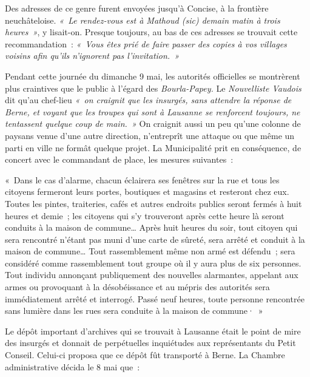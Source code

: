 \documentclass[french,twoside]{book} %
\newenvironment{quoteblock}%
  {\begin{quoting}}
  {\end{quoting}}
\newenvironment{quotebar}{%
    \def\FrameCommand{{\color{rubric!10!}\vrule width 0.5em} \hspace{0.9em}}%
    \def\OuterFrameSep{\itemsep} %
    \MakeFramed {\advance\hsize-\width \FrameRestore}
  }%
  {%
    \endMakeFramed
  }
\renewenvironment{quoteblock}%
  {%
    \savenotes
    \setstretch{0.9}
    \normalfont
    \begin{quotebar}
  }
  {%
    \end{quotebar}
    \spewnotes
  }
\begin{document}
\noindent Des adresses de ce genre furent envoyées jusqu’à Concise, à la frontière neuchâteloise. \emph{« Le rendez-vous est à Mathoud \emph{(sic)} demain matin à trois heures »}, y lisait-on. Presque toujours, au bas de ces adresses se trouvait cette recommandation : \emph{« Vous êtes prié de faire passer des copies à vos villages voisins afin qu’ils n’ignorent pas l’invitation. »}\par
Pendant cette journée du dimanche 9 mai, les autorités officielles se montrèrent plus craintives que le public à l’égard des \emph{Bourla-Papey.} Le \emph{Nouvelliste Vaudois} dit qu’au chef-lieu \emph{« on craignit que les insurgés, sans attendre la réponse de Berne, et voyant que les troupes qui sont à Lausanne se renforcent toujours, ne tentassent quelque coup de main. »} On craignit aussi un peu qu’une colonne de paysans venue d’une autre direction, n’entreprît une attaque ou que même un parti en ville ne formât quelque projet. La Municipalité prit en conséquence, de concert avec le commandant de place, les mesures suivantes :\par

\begin{quoteblock}
 \noindent « Dans le cas d’alarme, chacun éclairera ses fenêtres sur la rue et tous les citoyens fermeront leurs portes, boutiques et magasins et resteront chez eux. Toutes les pintes, traiteries, cafés et autres endroits publics seront fermés à huit heures et demie ; les citoyens qui s’y trouveront après cette heure là seront conduits à la maison de commune… Après huit heures du soir, tout citoyen qui sera rencontré n’étant pas muni d’une carte de sûreté, sera arrêté et conduit à la maison de commune… Tout rassemblement même non armé est défendu ; sera considéré comme rassemblement tout groupe où il y aura plus de six personnes. Tout individu annonçant publiquement des nouvelles alarmantes, appelant aux armes ou provoquant à la désobéissance et au mépris des autorités sera immédiatement arrêté et interrogé. Passé neuf heures, toute personne rencontrée sans lumière dans les rues sera conduite à la maison de commune· »
 \end{quoteblock}

\noindent Le dépôt important d’archives qui se trouvait à Lausanne était le point de mire des insurgés et donnait de perpétuelles inquiétudes aux représentants du Petit Conseil. Celui-ci proposa que ce dépôt fût transporté à Berne. La Chambre administrative décida le 8 mai que :\par
\end{document}

